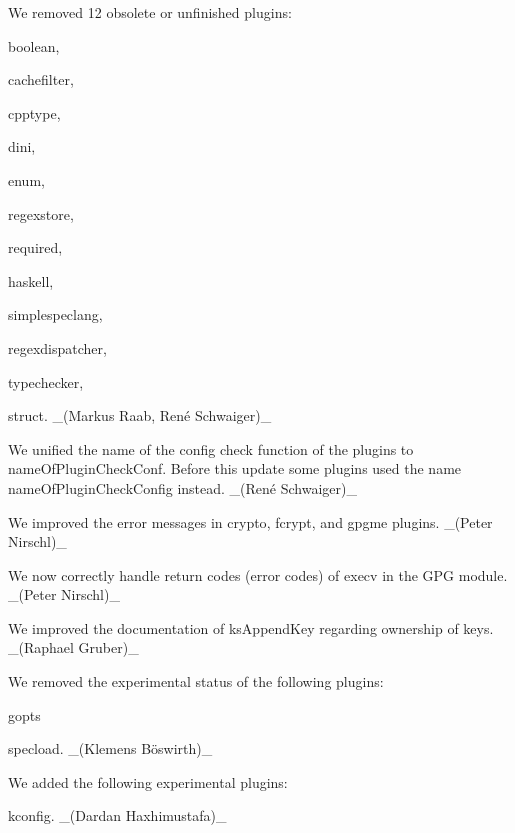 \begin{DoxyItemize}
\item We removed 12 obsolete or unfinished plugins\+:
\begin{DoxyItemize}
\item {\ttfamily boolean},
\item {\ttfamily cachefilter},
\item {\ttfamily cpptype},
\item {\ttfamily dini},
\item {\ttfamily enum},
\item {\ttfamily regexstore},
\item {\ttfamily required},
\item {\ttfamily haskell},
\item {\ttfamily simplespeclang},
\item {\ttfamily regexdispatcher},
\item {\ttfamily typechecker},
\item {\ttfamily struct}. \+\_\+(Markus Raab, René Schwaiger)\+\_\+
\end{DoxyItemize}
\item We unified the name of the config check function of the plugins to {\ttfamily name\+Of\+Plugin\+Check\+Conf}. Before this update some plugins used the name {\ttfamily name\+Of\+Plugin\+Check\+Config} instead. \+\_\+(René Schwaiger)\+\_\+
\item We improved the error messages in {\ttfamily crypto}, {\ttfamily fcrypt}, and {\ttfamily gpgme} plugins. \+\_\+(\+Peter Nirschl)\+\_\+
\item We now correctly handle return codes (error codes) of {\ttfamily execv} in the G\+PG module. \+\_\+(\+Peter Nirschl)\+\_\+
\item We improved the documentation of {\ttfamily ks\+Append\+Key} regarding ownership of keys. \+\_\+(\+Raphael Gruber)\+\_\+
\item We removed the experimental status of the following plugins\+:
\begin{DoxyItemize}
\item {\ttfamily gopts}
\item {\ttfamily specload}. \+\_\+(Klemens Böswirth)\+\_\+
\end{DoxyItemize}
\item We added the following experimental plugins\+:
\begin{DoxyItemize}
\item {\ttfamily kconfig}. \+\_\+(\+Dardan Haxhimustafa)\+\_\+
\end{DoxyItemize}
\end{DoxyItemize}

